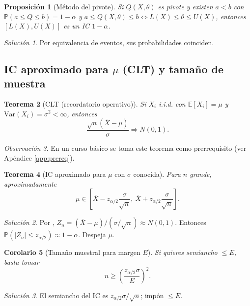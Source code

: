 \documentclass[11pt]{article}
\theoremstyle{plain}
\newtheorem{theorem}{Teorema}[section]
\newtheorem{proposition}[theorem]{Proposición}
\newtheorem{corollary}[theorem]{Corolario}
\theoremstyle{definition}
\theoremstyle{remark}
\newtheorem{remark}[theorem]{Observación}
\theoremstyle{solstyle}
\newtheorem*{solution}{Solución}
\newcommand{\E}{\mathbb{E}}
\newcommand{\Var}{\mathrm{Var}}
\newcommand{\Pbb}{\mathbb{P}}
\newcommand{\1}{\mathbbm{1}}
\newcommand{\Xbar}{\overline{X}}
\begin{document}
\begin{proposition}[Método del pivote]\label{prop:pivot}
Si $Q(X,\theta)$ es pivote y existen $a<b$ con $\Pbb(a\le Q\le b)=1-\alpha$ y
$a\le Q(X,\theta)\le b \iff L(X)\le \theta\le U(X)$, entonces $[L(X),U(X)]$ es un IC $1-\alpha$.
\end{proposition}

\begin{solution}
Por equivalencia de eventos, sus probabilidades coinciden.
\end{solution}

\subsection{IC aproximado para $\mu$ (CLT) y tamaño de muestra}

\begin{theorem}[CLT (recordatorio operativo)]\label{thm:CLT}
Si $X_i$ i.i.d. con $\E[X_i]=\mu$ y $\Var(X_i)=\sigma^2<\infty$, entonces
\[
\frac{\sqrt{n}(\Xbar-\mu)}{\sigma}\Rightarrow N(0,1).
\]
\end{theorem}

\begin{remark}
En un curso básico se toma este teorema como prerrequisito (ver Apéndice \ref{app:prereq}).
\end{remark}

\begin{theorem}[IC aproximado para $\mu$ con $\sigma$ conocida]\label{thm:CImeanCLT}
Para $n$ grande, aproximadamente
\[
\mu\in\left[\Xbar - z_{\alpha/2}\frac{\sigma}{\sqrt n},\ \Xbar + z_{\alpha/2}\frac{\sigma}{\sqrt n}\right].
\]
\end{theorem}

\begin{solution}
Por , $Z_n=(\Xbar-\mu)/(\sigma/\sqrt n)\approx N(0,1)$.
Entonces $\Pbb(|Z_n|\le z_{\alpha/2})\approx 1-\alpha$.
Despeja $\mu$.
\end{solution}

\begin{corollary}[Tamaño muestral para margen $E$]\label{cor:nforE}
Si quieres semiancho $\le E$, basta tomar
\[
n\ge \left(\frac{z_{\alpha/2}\sigma}{E}\right)^2.
\]
\end{corollary}

\begin{solution}
El semiancho del IC es $z_{\alpha/2}\sigma/\sqrt n$; impón $\le E$.
\end{solution}
\end{document}
